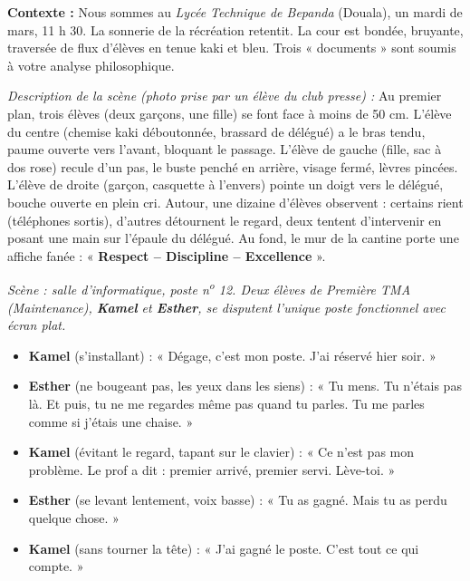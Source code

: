 \documentclass[11pt]{article}
\newcounter{popsec}
\newcounter{popsub}
\newcommand{\courssub}[1]{%
  \stepcounter{popsub}%
  \par\vspace{9pt}\noindent{\popxbold\fontsize{11.5}{13}\selectfont\color{popink}{\color{poporange}\thepopsec.\thepopsub}\hspace{6pt}#1}\par\nopagebreak\vspace{4pt}
}
\begin{document}
\courssub{Situation}
\textbf{Contexte :} Nous sommes au \emph{Lycée Technique de Bepanda} (Douala), un mardi de mars, 11 h 30. La sonnerie de la récréation retentit. La cour est bondée, bruyante, traversée de flux d'élèves en tenue kaki et bleu. Trois « documents » sont soumis à votre analyse philosophique.

\begin{exemplebox}
\emph{Description de la scène (photo prise par un élève du club presse) :} Au premier plan, trois élèves (deux garçons, une fille) se font face à moins de 50 cm. L'élève du centre (chemise kaki déboutonnée, brassard de délégué) a le bras tendu, paume ouverte vers l'avant, bloquant le passage. L'élève de gauche (fille, sac à dos rose) recule d'un pas, le buste penché en arrière, visage fermé, lèvres pincées. L'élève de droite (garçon, casquette à l'envers) pointe un doigt vers le délégué, bouche ouverte en plein cri. Autour, une dizaine d'élèves observent : certains rient (téléphones sortis), d'autres détournent le regard, deux tentent d'intervenir en posant une main sur l'épaule du délégué. Au fond, le mur de la cantine porte une affiche fanée : « \textbf{Respect – Discipline – Excellence} ».
\end{exemplebox}

\begin{exemplebox}
\emph{Scène : salle d'informatique, poste n\textsuperscript{o} 12. Deux élèves de Première TMA (Maintenance), \textbf{Kamel} et \textbf{Esther}, se disputent l'unique poste fonctionnel avec écran plat.}
\begin{itemize}
    \item \textbf{Kamel} (s'installant) : « Dégage, c'est mon poste. J'ai réservé hier soir. »
    \item \textbf{Esther} (ne bougeant pas, les yeux dans les siens) : « Tu mens. Tu n'étais pas là. Et puis, tu ne me regardes même pas quand tu parles. Tu me parles comme si j'étais une chaise. »
    \item \textbf{Kamel} (évitant le regard, tapant sur le clavier) : « Ce n'est pas mon problème. Le prof a dit : premier arrivé, premier servi. Lève-toi. »
    \item \textbf{Esther} (se levant lentement, voix basse) : « Tu as gagné. Mais tu as perdu quelque chose. »
    \item \textbf{Kamel} (sans tourner la tête) : « J'ai gagné le poste. C'est tout ce qui compte. »
\end{itemize}
\end{exemplebox}
\end{document}
